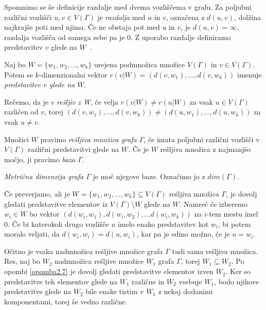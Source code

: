 \documentclass[mat1, tisk]{fmfdelo}
\begin{document}
%
Spomnimo se še definicije razdalje med dvema vozliščema v grafu. Za poljubni različni vozlišči 
$u,v \in V(\Gamma)$ je \emph{razdalja} med $u$ in $v$, označena z $d(u,v)$, dolžina 
najkrajše poti med njima. Če ne obstaja pot med $u$ in $v$, je $d(u,v) = \infty $, 
razdalja vozlišča od samega sebe pa je $0$.
Z uporabo razdalje definiramo predstavitev $v$ glede na $W$~\cite{7dolzan}.
%
\begin{definicija}
  Naj bo $W = \{ w_1,w_2, \ldots, w_k \}$ urejena podmnožica množice $V(\Gamma)$ in 
  $v \in V(\Gamma)$. Potem 
  se $k$-dimenzionalni vektor $r(v|W)=( d(v,w_1), \ldots, d(v,w_k) )$ imenuje 
  \emph{predstavitev $v$ glede na $W$}. 

  Rečemo, da je $v$ \emph{rešljiv z W}, če velja $r(v|W) \neq r(u|W)$ 
  za vsak $u \in V(\Gamma)$ različen od $v$, torej 
  $( d(v,w_1), \ldots, d(v,w_k) ) \neq ( d(u,w_1), \ldots, d(u,w_k) )$ za vsak 
  $u \neq v$.
\end{definicija}
%
Množici $W$ pravimo \emph{rešljiva množica grafa $\Gamma$}, če imata poljubni različni 
vozlišči v $V(\Gamma)$ različni predstavitvi glede na $W$. Če je $W$ rešljiva množica 
z najmanjšo močjo, ji pravimo \emph{baza $\Gamma$}.
%
\begin{definicija}
  \emph{Metrična dimenzija grafa $\Gamma$} je moč njegove baze. Označimo jo z $dim(\Gamma)$.
\end{definicija}
%
\begin{opomba}\label{opomba2.7}
  Če preverjamo, ali je $W= \{w_1,w_2, \ldots, w_k\} \subseteq V(\Gamma)$ 
  rešljiva množica $\Gamma$, je dovolj gledati predstavitve elementov iz 
  $V(\Gamma) \setminus W$ glede na $W$. Namreč če izberemo $w_i \in W$ bo vektor 
  $(d(w_i,w_1),d(w_i,w_2), \ldots d(w_i,w_k))$ na $i$-tem mestu imel 0. 
  Če bi katerokoli drugo vozlišče $u$ imelo enako predstavitev kot $w_i$, bi 
  potem moralo veljati, da $d(w_i,w_i) = d(u,w_i)$, kar pa je edino možno, 
  če je $u = w_i$.
\end{opomba}
%
\begin{opomba}\label{opomba2.8}
  Očitno je vsaka nadmnožica rešljive množice grafa $\Gamma$ tudi sama rešljiva 
  množica. Res, naj bo $W_2$ nadmnožica rešljive množice $W_1$ grafa $\Gamma$, 
  torej $W_1 \subseteq W_2$. Po opombi \ref{opomba2.7} je dovolj gledati 
  predstavitve elementov izven $W_2$. Ker so predstavitve teh elementov glede na 
  $W_1$ različne in $W_2$ vsebuje $W_1$, bodo njihove predstavitve glede na 
  $W_2$ bile enake tistim v $W_1$ z nekaj dodanimi komponentami, torej še vedno 
  različne.
\end{opomba}
\end{document}
